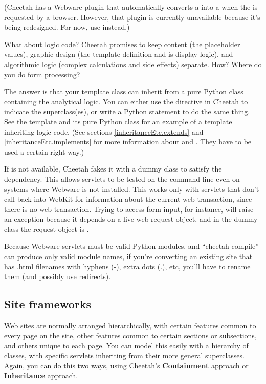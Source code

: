 (Cheetah has a Webware plugin that automatically converts a  into a  when the  is
requested by a browser.  However, that plugin is currently unavailable because
it's being redesigned.  For now, use  instead.)

What about logic code?  Cheetah promises to keep content (the placeholder
values), graphic design (the template definition and is display logic), and
algorithmic logic (complex calculations and side effects) separate.  How?
Where do you do form processing?

The answer is that your template class can inherit from a pure Python class
containing the analytical logic.  You can either use the 
directive in Cheetah to indicate the superclass(es), or write a Python
 statement to do the same thing.  See the template
 and its pure Python class
 for an example of a template
inheriting logic code.  (See sections \ref{inheritanceEtc.extends} and
\ref{inheritanceEtc.implements} for more information about  and
.  They have to be used a certain right way.)

If  is not available, Cheetah fakes it with a
dummy class to satisfy the dependency.  This allows servlets to be tested on
the command line even on systems where Webware is not installed.  This works
only with servlets that don't call back into WebKit for information about the
current web transaction, since there is no web transaction.  Trying to access
form input, for instance, will raise an exception because it depends on a
live web request object, and in the dummy class the request object is
.

Because Webware servlets must be valid Python modules, and ``cheetah compile''
can produce only valid module names, if you're converting an existing site that
has .html filenames with hyphens (-), extra dots (.), etc, you'll have to
rename them (and possibly use redirects).

\subsection{Site frameworks}
\label{webware.siteFrameworks}

Web sites are normally arranged hierarchically, with certain features common 
to every page on the site, other features common to certain sections or
subsections, and others unique to each page.  You can model this easily with
a hierarchy of classes, with specific servlets inheriting from their more
general superclasses.  Again, you can do this two ways, using Cheetah's
{\bf Containment} approach or {\bf Inheritance} approach.

